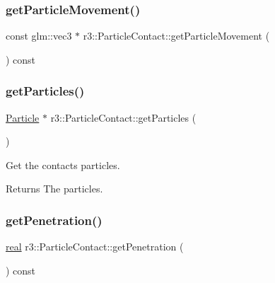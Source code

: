 \subsubsection{\texorpdfstring{get\+Particle\+Movement()}{getParticleMovement()}}
{\footnotesize\ttfamily const glm\+::vec3 $\ast$ r3\+::\+Particle\+Contact\+::get\+Particle\+Movement (\begin{DoxyParamCaption}{ }\end{DoxyParamCaption}) const}

\mbox{\label{classr3_1_1_particle_contact_aeeacfbf5cbed36cf2be65775066e8f14}} 
\subsubsection{\texorpdfstring{get\+Particles()}{getParticles()}}
{\footnotesize\ttfamily \mbox{\hyperlink{classr3_1_1_particle}{Particle}} $\ast$ r3\+::\+Particle\+Contact\+::get\+Particles (\begin{DoxyParamCaption}{ }\end{DoxyParamCaption})}



Get the contact\textquotesingle{}s particles. 

\begin{DoxyReturn}{Returns}
The particles. 
\end{DoxyReturn}
\mbox{\label{classr3_1_1_particle_contact_a9bff741e1a56b01dc43013cab0b9ae08}} 
\subsubsection{\texorpdfstring{get\+Penetration()}{getPenetration()}}
{\footnotesize\ttfamily \mbox{\hyperlink{namespacer3_ab2016b3e3f743fb735afce242f0dc1eb}{real}} r3\+::\+Particle\+Contact\+::get\+Penetration (\begin{DoxyParamCaption}{ }\end{DoxyParamCaption}) const}



